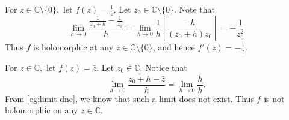 \documentclass[11pt, oneside]{book}
\begin{document}
\begin{eg}
	For $z \in \mathbb{C} \setminus \{0\},$ let $f(z) = \frac{1}{z}$. Let $z_0 \in \mathbb{C} \setminus \{0\}$. Note that
	\begin{equation*}
		\lim_{h \to 0} \frac{\frac{1}{z_0 + h} - \frac{1}{z_0}}{h} = \lim_{h \to 0} \frac{1}{h} \left[ \frac{-h}{(z_0 + h)z_0} \right] = -\frac{1}{z_0^2} 
	\end{equation*}
	Thus $f$ is holomorphic at any $z \in \mathbb{C} \setminus \{0\}$, and hence $f'(z) = -\frac{1}{z}$.
\end{eg}

\begin{eg}
	For $z \in \mathbb{C},$ let $f(z) = \bar{z}$. Let $z_0 \in \mathbb{C}$. Notice that
	\begin{equation*}
		\lim_{h \to 0} \frac{\bar{z_0 + h} - \bar{z}}{h} = \lim_{h \to 0} \frac{\bar{h}}{h}.
	\end{equation*}
	From \cref{eg:limit dne}, we know that such a limit does not exist. Thus $f$ is not holomorphic on any $z \in \mathbb{C}$.
\end{eg}
\end{document}
